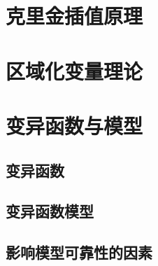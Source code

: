 \section{克里金插值原理}

\section{区域化变量理论}

\section{变异函数与模型}

\subsection{变异函数}

\subsection{变异函数模型}

\subsection{影响模型可靠性的因素}

\section{}